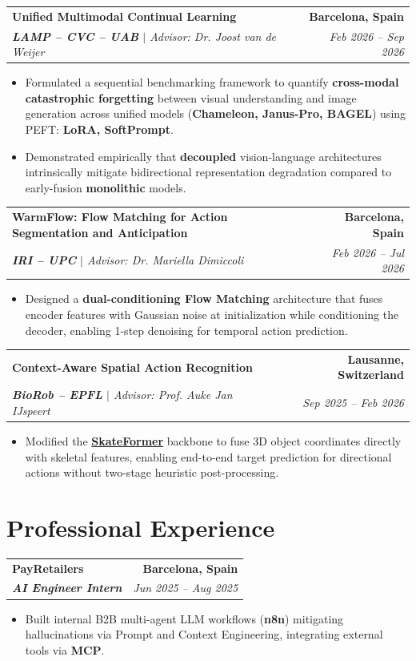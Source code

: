 \documentclass[a4paper,10pt]{article}
\makeatletter
\newcommand{\cvsubheading}[4]{%
  \vspace{2.5pt}
  \begin{tabular*}{\textwidth}{@{}l@{\extracolsep{\fill}}r@{}}
    \textbf{\color{darkred}#1} & {\footnotesize\textbf{\color{darkgray}#2}} \\
    \textit{\footnotesize\color{darkgray}#3} & \textit{\footnotesize\color{lightgray}#4} \\
  \end{tabular*}
  \vspace{-4pt}
}
\newcommand{\cvitem}[1]{%
  \item[\color{epflred}\footnotesize$\triangleright$] {\small #1}
}
\makeatother
\begin{document}
\cvsubheading
{Unified Multimodal Continual Learning}{Barcelona, Spain}
{\textbf{LAMP -- CVC -- UAB} $|$ Advisor: Dr. Joost van de Weijer}{Feb 2026 -- Sep 2026}
\begin{itemize}
    \cvitem{Formulated a sequential benchmarking framework to quantify \textbf{cross-modal catastrophic forgetting} between visual understanding and image generation across unified models (\textbf{Chameleon, Janus-Pro, BAGEL}) using PEFT: \textbf{LoRA, SoftPrompt}.}
    \cvitem{Demonstrated empirically that \textbf{decoupled} vision-language architectures intrinsically mitigate bidirectional representation degradation compared to early-fusion \textbf{monolithic} models.}
\end{itemize}

\cvsubheading
{WarmFlow: Flow Matching for Action Segmentation and Anticipation}{Barcelona, Spain}
{\textbf{IRI -- UPC} $|$ Advisor: Dr. Mariella Dimiccoli}{Feb 2026 -- Jul 2026}
\begin{itemize}
    \cvitem{Designed a \textbf{dual-conditioning Flow Matching} architecture that fuses encoder features with Gaussian noise at initialization while conditioning the decoder, enabling 1-step denoising for temporal action prediction.}
\end{itemize}

\cvsubheading
{Context-Aware Spatial Action Recognition}{Lausanne, Switzerland}
{\textbf{BioRob -- EPFL} $|$ Advisor: Prof. Auke Jan IJspeert}{Sep 2025 -- Feb 2026}
\begin{itemize}
    \cvitem{Modified the \href{https://arxiv.org/abs/2403.09508}{\textbf{SkateFormer}} backbone to fuse 3D object coordinates directly with skeletal features, enabling end-to-end target prediction for directional actions without two-stage heuristic post-processing.}
\end{itemize}

\section{Professional Experience}

\cvsubheading
{PayRetailers}{Barcelona, Spain}
{\textbf{AI Engineer Intern}}{Jun 2025 -- Aug 2025}
\begin{itemize}
    \cvitem{Built internal B2B multi-agent LLM workflows (\textbf{n8n}) mitigating hallucinations via Prompt and Context Engineering, integrating external tools via \textbf{MCP}.}
\end{itemize}
\end{document}
